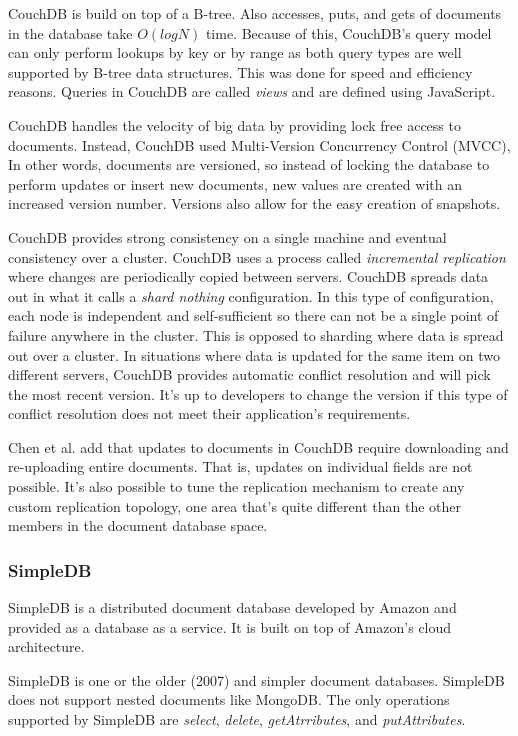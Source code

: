 \documentclass[]{article}
\begin{document}
CouchDB is build on top of a B-tree. Also accesses, puts, and gets of documents in the database take $O(log N)$ time. Because of this, CouchDB's query model can only perform lookups by key or by range as both query types are well supported by B-tree data structures. This was done for speed and efficiency reasons. Queries in CouchDB are called \textit{views} and are defined using JavaScript\cite{cattell_scalable_2011}.

CouchDB handles the velocity of big data by providing lock free access to documents. Instead, CouchDB used Multi-Version Concurrency Control (MVCC), In other words, documents are versioned, so instead of locking the database to perform updates or insert new documents, new values are created with an increased version number. Versions also allow for the easy creation of snapshots.

CouchDB provides strong consistency on a single machine and eventual consistency over a cluster. CouchDB uses a process called \textit{incremental replication} where changes are periodically copied between servers. CouchDB spreads data out in what it calls a \textit{shard nothing} configuration. In this type of configuration, each node is independent and self-sufficient so there can not be a single point of failure anywhere in the cluster. This is opposed to sharding where data is spread out over a cluster. In situations where data is updated for the same item on two different servers, CouchDB provides automatic conflict resolution and will pick the most recent version. It's up to developers to change the version if this type of conflict resolution does not meet their application's requirements.

Chen et al\cite{chen_big_2014}. add that updates to documents in CouchDB require downloading and re-uploading entire documents. That is, updates on individual fields are not possible. It's also possible to tune the replication mechanism to create any custom replication topology, one area that's quite different than the other members in the document database space.

\subsubsection{SimpleDB}\label{sssec:simpledb}
SimpleDB\cite{cattell_scalable_2011} is a distributed document database developed by Amazon and provided as a database as a service. It is built on top of Amazon's cloud architecture. 

SimpleDB is one or the older (2007) and simpler document databases. SimpleDB does not support nested documents like MongoDB. The only operations supported by SimpleDB are \textit{select}, \textit{delete}, \textit{getAtrributes}, and \textit{putAttributes}.
\end{document}
